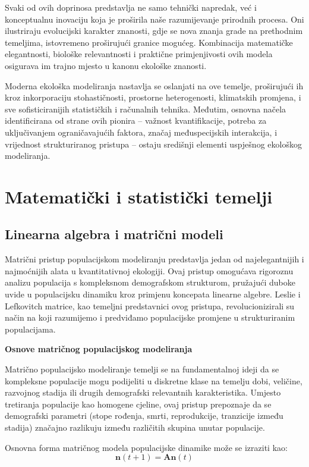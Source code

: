 \documentclass[11pt,oneside]{book}
\begin{document}
Svaki od ovih doprinosa predstavlja ne samo tehnički napredak, već i konceptualnu inovaciju koja je proširila naše razumijevanje prirodnih procesa. Oni ilustriraju evolucijski karakter znanosti, gdje se nova znanja grade na prethodnim temeljima, istovremeno proširujući granice mogućeg. Kombinacija matematičke elegantnosti, biološke relevantnosti i praktične primjenjivosti ovih modela osigurava im trajno mjesto u kanonu ekološke znanosti.

Moderna ekološka modeliranja nastavlja se oslanjati na ove temelje, proširujući ih kroz inkorporaciju stohastičnosti, prostorne heterogenosti, klimatskih promjena, i sve sofisticiranijih statističkih i računalnih tehnika. Međutim, osnovna načela identificirana od strane ovih pionira -- važnost kvantifikacije, potreba za uključivanjem ograničavajućih faktora, značaj međuspecijskih interakcija, i vrijednost strukturiranog pristupa -- ostaju središnji elementi uspješnog ekološkog modeliranja.

	\chapter{Matematički i statistički temelji}
\section{Linearna algebra i matrični modeli}

Matrični pristup populacijskom modeliranju predstavlja jedan od najelegantnijih i najmoćnijih alata u kvantitativnoj ekologiji. Ovaj pristup omogućava rigoroznu analizu populacija s kompleksnom demografskom strukturom, pružajući duboke uvide u populacijsku dinamiku kroz primjenu koncepata linearne algebre. Leslie i Lefkovitch matrice, kao temeljni predstavnici ovog pristupa, revolucionizirali su način na koji razumijemo i predviđamo populacijske promjene u strukturiranim populacijama.

\textbf{Osnove matričnog populacijskog modeliranja}

Matrično populacijsko modeliranje temelji se na fundamentalnoj ideji da se kompleksne populacije mogu podijeliti u diskretne klase na temelju dobi, veličine, razvojnog stadija ili drugih demografski relevantnih karakteristika. Umjesto tretiranja populacije kao homogene cjeline, ovaj pristup prepoznaje da se demografski parametri (stope rođenja, smrti, reprodukcije, tranzicije između stadija) značajno razlikuju između različitih skupina unutar populacije.

Osnovna forma matričnog modela populacijske dinamike može se izraziti kao:
$$\mathbf{n}(t+1) = \mathbf{A} \mathbf{n}(t)$$
\end{document}
